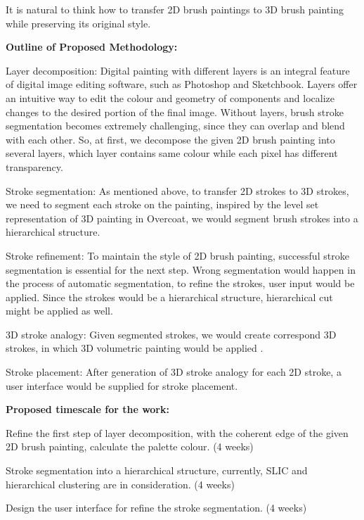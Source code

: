 It is natural to think how to transfer 2D brush paintings to 3D brush painting while preserving its original style. \newline

\textbf{Outline of Proposed Methodology: }\newline

Layer decomposition:  Digital painting with different layers is an integral feature of digital image editing software, such as Photoshop and Sketchbook. Layers offer an intuitive way to edit the colour and geometry of components and localize changes to the desired portion of the final image. Without layers, brush stroke segmentation becomes extremely challenging, since they can overlap and blend with each other. So, at first, we decompose the given 2D brush painting into several layers, which layer contains same colour while each pixel has different transparency. 

Stroke segmentation: As mentioned above, to transfer 2D strokes to 3D strokes, we need to segment each stroke on the painting, inspired by the level set representation of 3D painting in Overcoat, we would segment brush strokes into a hierarchical structure.  

Stroke refinement: To maintain the style of 2D brush painting, successful stroke segmentation is essential for the next step. Wrong segmentation would happen in the process of automatic segmentation, to refine the strokes, user input would be applied. Since the strokes would be a hierarchical structure, hierarchical cut might be applied as well. 

3D stroke analogy: Given segmented strokes, we would create correspond 3D strokes, in which 3D volumetric painting would be applied \cite{kim2017canvox}.

Stroke placement: After generation of 3D stroke analogy for each 2D stroke, a user interface would be supplied for stroke placement.  \newline

\textbf{Proposed timescale for the work:}\newline

Refine the first step of layer decomposition, with the coherent edge of the given 2D brush painting, calculate the palette colour. (4 weeks)

Stroke segmentation into a hierarchical structure, currently, SLIC and hierarchical clustering are in consideration. (4 weeks)

Design the user interface for refine the stroke segmentation. (4 weeks)

